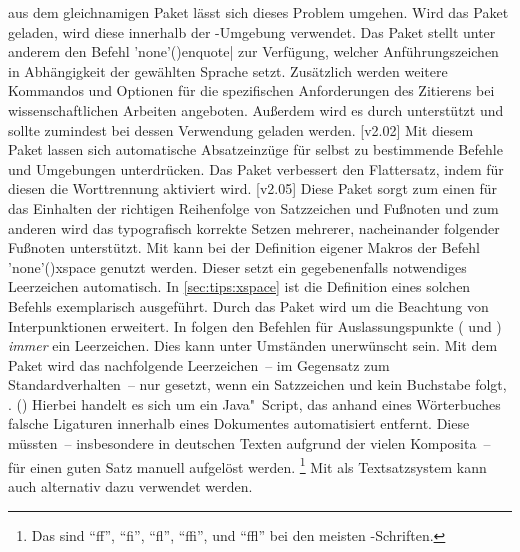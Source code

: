 \begin{DeclarePackages}[Typografie]
  aus dem gleichnamigen Paket lässt sich dieses Problem umgehen. Wird das Paket 
  geladen, wird diese innerhalb der -Umgebung verwendet.
  Das Paket stellt unter anderem den Befehl 
  \Macro'none'(){enquote|}
  zur Verfügung, welcher Anführungszeichen in Abhängigkeit der gewählten 
  Sprache setzt. Zusätzlich werden weitere Kommandos und Optionen für die 
  spezifischen Anforderungen des Zitierens bei wissenschaftlichen Arbeiten 
  angeboten. Außerdem wird es durch  unterstützt und sollte 
  zumindest bei dessen Verwendung geladen werden.
[v2.02]
  Mit diesem Paket lassen sich automatische Absatzeinzüge für selbst zu 
  bestimmende Befehle und Umgebungen unterdrücken.
  Das Paket verbessert den Flattersatz, indem für diesen die Worttrennung 
  aktiviert wird.
[v2.05]
  Diese Paket sorgt zum einen für das Einhalten der richtigen Reihenfolge von 
  Satzzeichen und Fußnoten und zum anderen wird das typografisch korrekte 
  Setzen mehrerer, nacheinander folgender Fußnoten unterstützt.
  Mit  kann bei der Definition eigener Makros der Befehl 
  \Macro'none'(){xspace} genutzt werden. Dieser setzt ein 
  gegebenenfalls notwendiges Leerzeichen automatisch. In 
  \autoref{sec:tips:xspace} ist die Definition eines solchen Befehls 
  exemplarisch ausgeführt. Durch das Paket  wird 
   um die Beachtung von Interpunktionen erweitert.
  In  folgen den Befehlen für Auslassungspunkte ( 
  und ) \emph{immer} ein Leerzeichen. Dies kann unter 
  Umständen unerwünscht sein. Mit dem Paket  wird das 
  nachfolgende Leerzeichen~-- im Gegensatz zum Standardverhalten~-- nur 
  gesetzt, wenn ein Satzzeichen und kein Buchstabe folgt, 
  .
()
  Hierbei handelt es sich um ein Java"~Script, das anhand eines Wörterbuches 
  falsche Ligaturen innerhalb eines Dokumentes automatisiert entfernt. Diese 
  müssten~-- insbesondere in deutschen Texten aufgrund der vielen Komposita~-- 
  für einen guten Satz manuell aufgelöst werden.%
  \footnote{%
    Das sind \enquote{ff}, \enquote{fi}, \enquote{fl}, \enquote{ffi}, und 
    \enquote{ffl} bei den meisten -Schriften.%
  }
  Mit  als Textsatzsystem kann auch  
  alternativ dazu verwendet werden.
\end{DeclarePackages}



